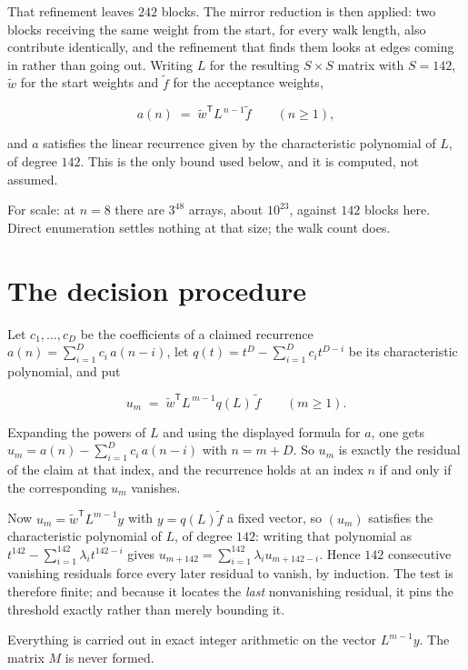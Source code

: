 \documentclass[11pt]{article}
\theoremstyle{definition}
\begin{document}
That refinement leaves $242$ blocks. The mirror reduction is then applied: two blocks receiving the same weight from the start, for every walk length, also contribute identically, and the refinement that finds them looks at edges coming in rather than going out. Writing $L$ for the resulting $S \times S$ matrix with $S = 142$, $\tilde w$ for the start weights and $\tilde f$ for the acceptance weights,

\[a(n) \;=\; \tilde w^{\mathsf T} L^{\,n-1} \tilde f \qquad (n \ge 1),\]

and $a$ satisfies the linear recurrence given by the characteristic polynomial of $L$, of degree $142$. This is the only bound used below, and it is computed, not assumed.

For scale: at $n = 8$ there are $3^{48}$ arrays, about $10^{23}$, against $142$ blocks here. Direct enumeration settles nothing at that size; the walk count does.

\section{The decision procedure}

Let $c_1,\dots,c_D$ be the coefficients of a claimed recurrence $a(n) = \sum_{i=1}^{D} c_i\,a(n-i)$, let $q(t) = t^{D} - \sum_{i=1}^{D} c_i t^{D-i}$ be its characteristic polynomial, and put

\[u_m \;=\; \tilde w^{\mathsf T} L^{\,m-1} q(L)\,\tilde f \qquad (m \ge 1).\]

Expanding the powers of $L$ and using the displayed formula for $a$, one gets $u_m = a(n) - \sum_{i=1}^{D} c_i\,a(n-i)$ with $n = m + D$. So $u_m$ is exactly the residual of the claim at that index, and the recurrence holds at an index $n$ if and only if the corresponding $u_m$ vanishes.

Now $u_m = \tilde w^{\mathsf T} L^{m-1} y$ with $y = q(L)\tilde f$ a fixed vector, so $(u_m)$ satisfies the characteristic polynomial of $L$, of degree $142$: writing that polynomial as $t^{142} - \sum_{i=1}^{142} \lambda_i t^{142-i}$ gives $u_{m+142} = \sum_{i=1}^{142} \lambda_i u_{m+142-i}$. Hence $142$ consecutive vanishing residuals force every later residual to vanish, by induction. The test is therefore finite; and because it locates the {\itshape last} nonvanishing residual, it pins the threshold exactly rather than merely bounding it.

Everything is carried out in exact integer arithmetic on the vector $L^{m-1}y$. The matrix $M$ is never formed.
\end{document}

